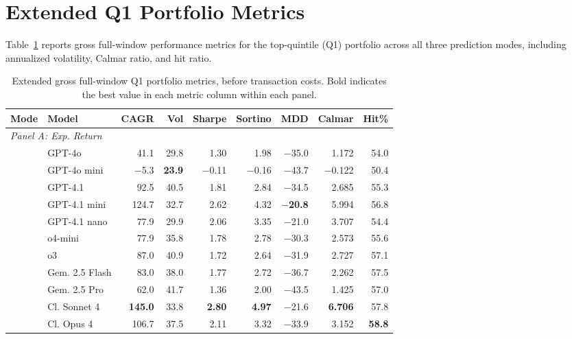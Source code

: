 \section{Extended Q1 Portfolio Metrics}
\label{app:q1-extended}

Table~\ref{tab:q1-extended} reports gross full-window performance metrics for the top-quintile (Q1) portfolio across all three prediction modes, including annualized volatility, Calmar ratio, and hit ratio.

\begin{table}[H]
\centering
\caption{Extended gross full-window Q1 portfolio metrics, before transaction costs. Bold indicates the best value in each metric column within each panel.}
\label{tab:q1-extended}
\scriptsize
\setlength{\tabcolsep}{3pt}
\renewcommand{\arraystretch}{0.80}
\begin{adjustbox}{width=\textwidth,totalheight=0.78\textheight,keepaspectratio}
\begin{tabular}{ll rrrrrrr}
\toprule
\textbf{Mode} & \textbf{Model} & \textbf{CAGR} & \textbf{Vol} & \textbf{Sharpe} & \textbf{Sortino} & \textbf{MDD} & \textbf{Calmar} & \textbf{Hit\%} \\
\midrule
\multicolumn{9}{l}{\textit{Panel A: Exp. Return}} \\
\midrule
& GPT-4o & 41.1 & 29.8 & 1.30 & 1.98 & $-$35.0 & 1.172 & 54.0 \\
& GPT-4o mini & $-$5.3 & \textbf{23.9} & $-$0.11 & $-$0.16 & $-$43.7 & $-$0.122 & 50.4 \\
& GPT-4.1 & 92.5 & 40.5 & 1.81 & 2.84 & $-$34.5 & 2.685 & 55.3 \\
& GPT-4.1 mini & 124.7 & 32.7 & 2.62 & 4.32 & \textbf{$-$20.8} & 5.994 & 56.8 \\
& GPT-4.1 nano & 77.9 & 29.9 & 2.06 & 3.35 & $-$21.0 & 3.707 & 54.4 \\
& o4-mini & 77.9 & 35.8 & 1.78 & 2.78 & $-$30.3 & 2.573 & 55.6 \\
& o3 & 87.0 & 40.9 & 1.72 & 2.64 & $-$31.9 & 2.727 & 57.1 \\
\cmidrule(l){2-9}
& Gem. 2.5 Flash & 83.0 & 38.0 & 1.77 & 2.72 & $-$36.7 & 2.262 & 57.5 \\
& Gem. 2.5 Pro & 62.0 & 41.7 & 1.36 & 2.00 & $-$43.5 & 1.425 & 57.0 \\
\cmidrule(l){2-9}
& Cl. Sonnet 4 & \textbf{145.0} & 33.8 & \textbf{2.80} & \textbf{4.97} & $-$21.6 & \textbf{6.706} & 57.8 \\
& Cl. Opus 4 & 106.7 & 37.5 & 2.11 & 3.32 & $-$33.9 & 3.152 & \textbf{58.8} \\

\end{tabular}
\end{adjustbox}
\end{table}
